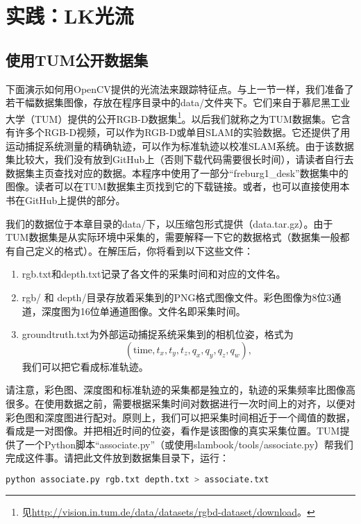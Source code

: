 \section{实践：LK光流}
\label{sec:LKFlow}
\subsection{使用TUM公开数据集}
下面演示如何用OpenCV提供的光流法来跟踪特征点。与上一节一样，我们准备了若干幅数据集图像，存放在程序目录中的data/文件夹下。它们来自于慕尼黑工业大学（TUM）提供的公开RGB-D数据集\footnote{见\url{http://vision.in.tum.de/data/datasets/rgbd-dataset/download}。}。以后我们就称之为TUM数据集。它含有许多个RGB-D视频，可以作为RGB-D或单目SLAM的实验数据。它还提供了用运动捕捉系统测量的精确轨迹，可以作为标准轨迹以校准SLAM系统。由于该数据集比较大，我们没有放到GitHub上（否则下载代码需要很长时间），请读者自行去数据集主页查找对应的数据。本程序中使用了一部分“freburg1\_desk”数据集中的图像。读者可以在TUM数据集主页找到它的下载链接。或者，也可以直接使用本书在GitHub上提供的部分。

我们的数据位于本章目录的data/下，以压缩包形式提供（data.tar.gz）。由于TUM数据集是从实际环境中采集的，需要解释一下它的数据格式（数据集一般都有自己定义的格式）。在解压后，你将看到以下这些文件：

\begin{enumerate}
	\item rgb.txt和depth.txt记录了各文件的采集时间和对应的文件名。
	\item rgb/ 和 depth/目录存放着采集到的PNG格式图像文件。彩色图像为8位3通道，深度图为16位单通道图像。文件名即采集时间。
	
	\item groundtruth.txt为外部运动捕捉系统采集到的相机位姿，格式为
	\[
	(\mathrm{time}, t_x, t_y, t_z, q_x, q_y, q_z, q_w),
	\]
	我们可以把它看成标准轨迹。
\end{enumerate}

请注意，彩色图、深度图和标准轨迹的采集都是独立的，轨迹的采集频率比图像高很多。在使用数据之前，需要根据采集时间对数据进行一次时间上的对齐，以便对彩色图和深度图进行配对。原则上，我们可以把采集时间相近于一个阈值的数据，看成是一对图像。并把相近时间的位姿，看作是该图像的真实采集位置。TUM提供了一个Python脚本“associate.py”（或使用slambook/tools/associate.py）帮我们完成这件事。请把此文件放到数据集目录下，运行：
\begin{lstlisting}[language=sh]
python associate.py rgb.txt depth.txt > associate.txt
\end{lstlisting}

